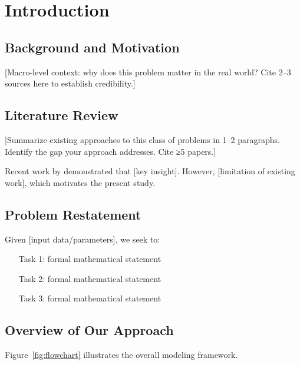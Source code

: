 \documentclass{mcmthesis}
\begin{document}
\section{Introduction}

\subsection{Background and Motivation}

[Macro-level context: why does this problem matter in the real world?
Cite 2–3 sources here to establish credibility.]

\subsection{Literature Review}

[Summarize existing approaches to this class of problems in 1–2 paragraphs.
Identify the gap your approach addresses. Cite ≥5 papers.]

Recent work by \cite{ref1} demonstrated that [key insight].
However, [limitation of existing work], which motivates the present study.

\subsection{Problem Restatement}

Given [input data/parameters], we seek to:
\begin{enumerate}
    \item [Task 1: formal mathematical statement]
    \item [Task 2: formal mathematical statement]
    \item [Task 3: formal mathematical statement]
\end{enumerate}

\subsection{Overview of Our Approach}

Figure~\ref{fig:flowchart} illustrates the overall modeling framework.
\end{document}
